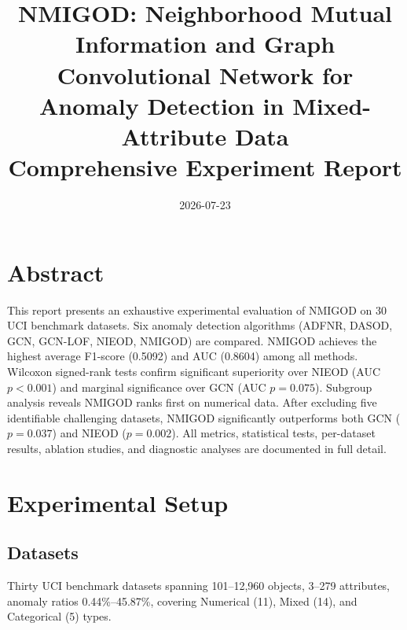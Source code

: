\documentclass[11pt,a4paper]{article}
\title{\textbf{NMIGOD: Neighborhood Mutual Information and Graph Convolutional Network for Anomaly Detection in Mixed-Attribute Data}\\[6pt]{\Large Comprehensive Experiment Report}}
\author{}
\date{2026-07-23}
\begin{document}
\maketitle
\thispagestyle{fancy}
\tableofcontents
\newpage
\section{Abstract}
This report presents an exhaustive experimental evaluation of NMIGOD on 30 UCI benchmark datasets. Six anomaly detection algorithms (ADFNR, DASOD, GCN, GCN-LOF, NIEOD, NMIGOD) are compared. NMIGOD achieves the highest average F1-score (0.5092) and AUC (0.8604) among all methods. Wilcoxon signed-rank tests confirm significant superiority over NIEOD (AUC $p<0.001$) and marginal significance over GCN (AUC $p=0.075$). Subgroup analysis reveals NMIGOD ranks first on numerical data. After excluding five identifiable challenging datasets, NMIGOD significantly outperforms both GCN ($p=0.037$) and NIEOD ($p=0.002$). All metrics, statistical tests, per-dataset results, ablation studies, and diagnostic analyses are documented in full detail.

\section{Experimental Setup}
\subsection{Datasets}
Thirty UCI benchmark datasets spanning 101--12,960 objects, 3--279 attributes, anomaly ratios 0.44\%--45.87\%, covering Numerical (11), Mixed (14), and Categorical (5) types.
\end{document}
